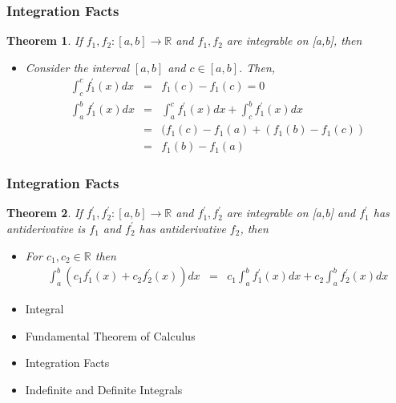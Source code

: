 \documentclass[handout]{beamer}
\newtheorem{thm}{Theorem}
\numberwithin{equation}{section}
\begin{document}
\begin{frame}
\frametitle{Integration Facts}

\begin{thm} If $f_{1}, f_{2}: [a,b] \rightarrow \mathbb{R}$ and $f_{1}, f_{2} $ are integrable on [a,b], then
\begin{itemize}
\item[i)] Consider the interval $[a,b]$ and $c \in [a,b]$.  Then, 
\begin{eqnarray}
\int_{c}^{c}f^{'}_{1}(x) dx & = & f_{1}(c) - f_{1}(c) = 0 \nonumber \\
\int_{a}^{b} f^{'}_{1} (x) dx & = & \int_{a}^{c} f^{'}_{1} (x) dx + \int_{c}^{b} f^{'}_{1}(x)dx \nonumber \\
										& = & (f_{1} (c) - f_{1}(a) +  (f_{1}(b) - f_{1}(c) ) \nonumber \\
										& = & f_{1}(b) - f_{1}(a) \nonumber 
\end{eqnarray}										  
\end{itemize}

\end{thm}

\end{frame}



\begin{frame}
\frametitle{Integration Facts}

\begin{thm} If $f_{1}^{'}, f_{2}^{'}: [a,b] \rightarrow\mathbb{R}$ and $f_{1}^{'}, f_{2}^{'} $ are integrable on [a,b] and $f_1^{'}$ has antiderivative is $f_1$ and $f_2^{'}$ has antiderivative $f_2$, then
\begin{itemize}
\item[ii)] For $c_{1}, c_{2} \in \mathbb{R}$ then
\begin{eqnarray}
\int_{a}^{b} (c_{1} f_{1}^{'}(x) + c_{2} f_{2}^{'}(x) ) dx & = & c_{1} \int_{a}^{b} f_{1}^{'}(x)dx  + c_{2} \int_{a}^{b}f_{2}^{'}(x) dx \nonumber 
\end{eqnarray}
\end{itemize}
\end{thm}

\end{frame}



\begin{frame}

\begin{itemize}
\item \textcolor{mygray}{Integral}
\item \textcolor{mygray}{Fundamental Theorem of Calculus}
\item \textcolor{mygray}{Integration Facts}
\item \textcolor{myblack}{Indefinite and Definite Integrals}
\end{itemize}

\end{frame}
\end{document}
